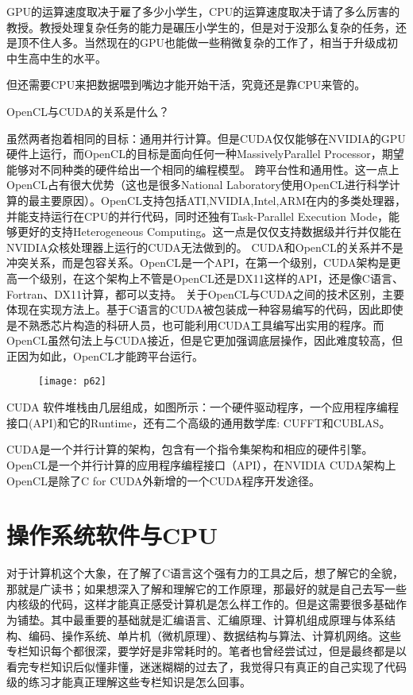 \documentclass[utf8]{book}
\begin{document}
GPU的运算速度取决于雇了多少小学生，CPU的运算速度取决于请了多么厉害的教授。教授处理复杂任务的能力是碾压小学生的，但是对于没那么复杂的任务，还是顶不住人多。当然现在的GPU也能做一些稍微复杂的工作了，相当于升级成初中生高中生的水平。

但还需要CPU来把数据喂到嘴边才能开始干活，究竟还是靠CPU来管的。

OpenCL与CUDA的关系是什么？

虽然两者抱着相同的目标：通用并行计算。但是CUDA仅仅能够在NVIDIA的GPU硬件上运行，而OpenCL的目标是面向任何一种MassivelyParallel Processor，期望能够对不同种类的硬件给出一个相同的编程模型。
跨平台性和通用性。这一点上OpenCL占有很大优势（这也是很多National Laboratory使用OpenCL进行科学计算的最主要原因）。OpenCL支持包括ATI,NVIDIA,Intel,ARM在内的多类处理器，并能支持运行在CPU的并行代码，同时还独有Task-Parallel Execution Mode，能够更好的支持Heterogeneous Computing。这一点是仅仅支持数据级并行并仅能在NVIDIA众核处理器上运行的CUDA无法做到的。
CUDA和OpenCL的关系并不是冲突关系，而是包容关系。OpenCL是一个API，在第一个级别，CUDA架构是更高一个级别，在这个架构上不管是OpenCL还是DX11这样的API，还是像C语言、Fortran、DX11计算，都可以支持。
关于OpenCL与CUDA之间的技术区别，主要体现在实现方法上。基于C语言的CUDA被包装成一种容易编写的代码，因此即使是不熟悉芯片构造的科研人员，也可能利用CUDA工具编写出实用的程序。而OpenCL虽然句法上与CUDA接近，但是它更加强调底层操作，因此难度较高，但正因为如此，OpenCL才能跨平台运行。

	\begin{figure}[H]
	\centering
	\texttt{[image: p62]}
	\end{figure}

CUDA 软件堆栈由几层组成，如图所示：一个硬件驱动程序，一个应用程序编程接口(API)和它的Runtime，还有二个高级的通用数学库: CUFFT和CUBLAS。

CUDA是一个并行计算的架构，包含有一个指令集架构和相应的硬件引擎。OpenCL是一个并行计算的应用程序编程接口（API），在NVIDIA CUDA架构上OpenCL是除了C for CUDA外新增的一个CUDA程序开发途径。


\chapter{操作系统软件与CPU}

	对于计算机这个大象，在了解了C语言这个强有力的工具之后，想了解它的全貌，那就是广读书；如果想深入了解和理解它的工作原理，那最好的就是自己去写一些内核级的代码，这样才能真正感受计算机是怎么样工作的。但是这需要很多基础作为铺垫。其中最重要的基础就是汇编语言、汇编原理、计算机组成原理与体系结构、编码、操作系统、单片机（微机原理）、数据结构与算法、计算机网络。这些专栏知识每个都很深，要学好是非常耗时的。笔者也曾经尝试过，但是最终都是以看完专栏知识后似懂非懂，迷迷糊糊的过去了，我觉得只有真正的自己实现了代码级的练习才能真正理解这些专栏知识是怎么回事。
	
\end{document}
